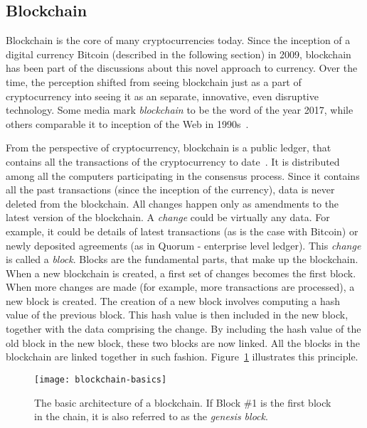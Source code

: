 \subsection{Blockchain}
% 
Blockchain is the core of many cryptocurrencies today. Since the inception of a digital currency Bitcoin (described in the following section) in 2009, blockchain has been part of the discussions about this novel approach to currency. Over the time, the perception shifted from seeing blockchain just as a part of cryptocurrency into seeing it as an separate, innovative, even disruptive technology. Some media mark \textit{blockchain} to be the word of the year 2017\footnotemark, while others comparable it to inception of the Web in 1990s~\cite[p. 14]{Swan2015BlockchainEconomy}.
% 

From the perspective of cryptocurrency, blockchain is a public ledger, that contains all the transactions of the cryptocurrency to date~\cite{Swan2015BlockchainEconomy}. It is distributed among all the computers participating in the consensus process. Since it contains all the past transactions (since the inception of the currency), data is never deleted from the blockchain. All changes happen only as amendments to the latest version of the blockchain. A \textit{change} could be virtually any data. For example, it could be details of latest transactions (as is the case with Bitcoin) or newly deposited agreements (as in Quorum - enterprise level ledger\footnotemark). This \textit{change} is called a \textit{block}. Blocks are the fundamental parts, that make up the blockchain. When a new blockchain is created, a first set of changes becomes the first block.
% 
% 
When more changes are made (for example, more transactions are processed), a new block is created. The creation of a new block involves computing a hash value of the previous block. This hash value is then included in the new block, together with the data comprising the change. By including the hash value of the old block in the new block, these two blocks are now linked. All the blocks in the blockchain are linked together in such fashion. Figure~\ref{fig:blockch-basics} illustrates this principle. 
% 
\begin{figure}[ht]
    \centering
    \texttt{[image: blockchain-basics]}
    \caption{The basic architecture of a blockchain. If Block \#1 is the first block in the chain, it is also referred to as the \textit{genesis block}.}
    \label{fig:blockch-basics}
\end{figure}

